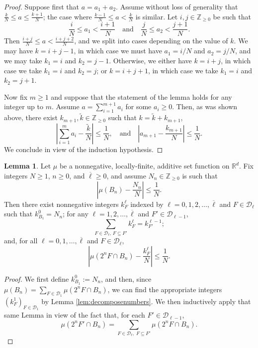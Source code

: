 \documentclass[11pt,reqno]{amsart}
\theoremstyle{definition}
\newcommand{\Rd}{{\mathbb{R}^d}}
\renewcommand{\tilde}{\widetilde}
\renewcommand{\tilde}{\widetilde}
\newcommand{\ZZ}{{\mathbb Z}}
\newcommand{\oline}[1]{\overline{#1}}
\newcommand{\mcl}{\mathcal}
\newtheorem{lemma}{Lemma}
\theoremstyle{definition}
\numberwithin{equation}{section}
\numberwithin{lemma}{section}
\numberwithin{proposition}{section}
\numberwithin{theorem}{section}
\numberwithin{corollary}{section}
\numberwithin{definition}{section}
\numberwithin{remark}{section}
\begin{document}
\begin{proof}
	Suppose first that $a = a_1 + a_2$. Assume without loss of generality that $\frac{k}{N} \le a \le \frac{k+1}{N}$;
	the case where $\frac{k-1}{N} \le a < \frac{k}{N}$ is similar. Let $i,j \in \ZZ_{\ge 0}$ be such that
	\[
		\frac{i}{N} \le a_1 < \frac{i+1}{N} \quad \text{and} \quad \frac{j}{N} \le a_2 < \frac{j+1}{N}.
	\]
    Then $\frac{i+j}{N} \le a < \frac{i+j+2}{N}$, and we split into cases depending on the value of $k$. We may have $k = i+j-1$, in which case we must have $a_1 = i/N$ and $a_2 = j/N$, and we may take $k_1 = i$ and $k_2 = j-1$. Otherwise, we either have $k = i+j$, in which case we take $k_1 = i$ and $k_2 = j$; or $k = i+j+1$, in which case we take $k_1 = i$ and $k_2 = j+1$.
	
	Now fix $m \ge 1$ and suppose that the statement of the lemma holds for any integer up to $m$. Assume $a = \sum_{i=1}^{m+1} a_i$ for some $a_i \ge 0$. Then, as was shown above, there exist $k_{m+1}, \tilde k \in \ZZ_{\ge 0}$ such that $k = \tilde k + k_{m+1}$,
	\[
		\left| \sum_{i=1}^{m} a_i - \frac{\tilde k}{N} \right| \le \frac{1}{N}, \quad \text{and} \quad \left| a_{m+1} - \frac{k_{m+1}}{N} \right| \le \frac{1}{N}.
	\]
	We conclude in view of the induction hypothesis.
\end{proof}

\begin{lemma}\label{lem:empirical_choices}
	Let $\mu$ be a nonnegative, locally-finite, additive set function on $\Rd$. Fix integers $N \ge 1$, $n \ge 0$, and $\oline \ell \ge 0$, and assume $N_n \in \ZZ_{\ge 0}$ is such that
	\[
		\left| \mu(B_n) - \frac{N_n}{N}\right| \le \frac{1}{N}.
	\]
	Then there exist nonnegative integers $k^\ell_F$ indexed by $\ell = 0,1,2, \ldots, \oline\ell$ and $F \in \mcl D_\ell$ such that $k^0_{B_1} = N_n$; for any $\ell = 1,2,\ldots, \oline\ell$ and $F' \in \mcl D_{\ell-1}$,
	\[
		\sum_{F \in \mcl D_{\ell}, \, F \subseteq F'} k^\ell_F = k^{\ell-1}_{F'} ;
	\]
	and, for all $\ell = 0,1,\ldots, \oline\ell$ and $F \in \mcl D_\ell$,
	\[
		\left|\mu(2^n F \cap B_n) - \frac{k^\ell_F}{N} \right| \le \frac{1}{N}.
	\]
\end{lemma}

\begin{proof}
	We first define $k^0_{B_1} := N_n$, and then, since $\mu(B_n) = \sum_{F \in \mcl D_1} \mu(2^nF \cap B_n)$,
	we can find the appropriate integers $(k^1_F)_{F \in \mcl D_1}$ by Lemma \ref{lem:decomposenumbers}. We then inductively apply that same Lemma in view of the fact that, for each $F' \in \mcl D_{\ell-1}$,
	\[
		\mu(2^n F' \cap B_n) = \sum_{F \in \mcl D_\ell, \; F \subseteq F'} \mu(2^n F \cap B_n).
	\]
\end{proof}
\end{document}

